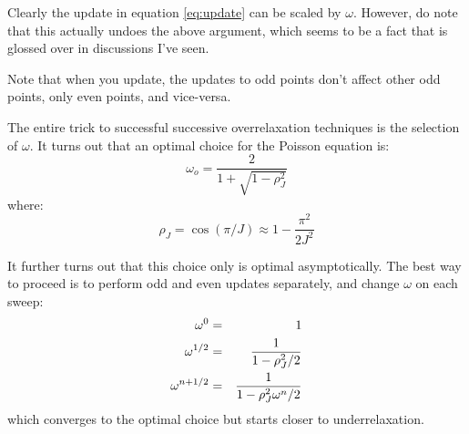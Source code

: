 Clearly the update in equation \ref{eq:update} can be scaled by
$\omega$. However, do note that this actually undoes the above
argument, which seems to be a fact that is glossed over in discussions
I've seen.

Note that when you update, the updates to odd points don't affect
other odd points, only even points, and vice-versa. 

The entire trick to successful successive overrelaxation techniques is
the selection of $\omega$. It turns out that an optimal choice for the
Poisson equation is:
\begin{equation}
\omega_{o} = \frac{2}{1+\sqrt{1-\rho_J^2}}
\end{equation}
where:
\begin{equation}
\rho_J = \cos(\pi/J) \approx 1 - \frac{\pi^2}{2J^2}
\end{equation}

It further turns out that this choice only is optimal
asymptotically. The best way to proceed is to perform odd and even
updates separately, and change $\omega$ on each sweep:
\begin{eqnarray}
\omega^{0} &=& 1 \cr
\omega^{1/2} &=& \frac{1}{1-\rho_J^2 /2} \cr
\omega^{n+1/2} &=& \frac{1}{1-\rho_J^2 \omega^n /2} \cr
\end{eqnarray}
which converges to the optimal choice but starts closer to
underrelaxation. 
